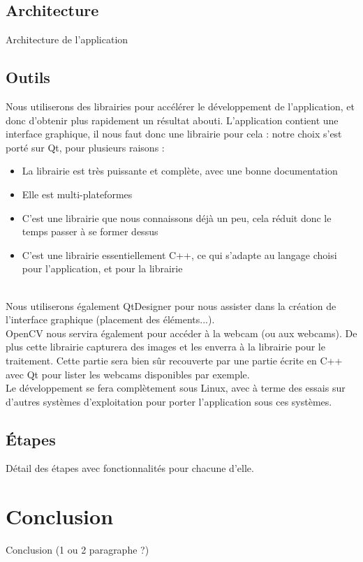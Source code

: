 \documentclass{article}
\begin{document}
		\subsection{Architecture}
			Architecture de l'application
		\subsection{Outils}
			Nous utiliserons des librairies pour accélérer le développement de l'application, et donc d'obtenir plus 
rapidement un résultat abouti.
		L'application contient une interface graphique, il nous faut donc une librairie pour cela :
		notre choix s'est porté sur Qt, pour plusieurs raisons : 
		\begin{itemize}
			\item La librairie est très puissante et complète, avec une bonne documentation
			\item Elle est multi-plateformes
			\item C'est une librairie que nous connaissons déjà un peu, cela réduit donc le temps passer à se former dessus
			\item C'est une librairie essentiellement C++, ce qui s'adapte au langage choisi pour l'application, et pour la librairie
		\end{itemize} \ \\
Nous utiliserons également QtDesigner pour nous assister dans la création de l'interface graphique (placement des éléments...). \\
		
OpenCV nous servira également pour accéder à la webcam (ou aux webcams). De plus cette librairie capturera des images et les enverra à la librairie pour le traitement. Cette partie sera bien sûr recouverte par une partie écrite en C++ avec Qt pour lister les webcams disponibles par exemple. \\

		Le développement se fera complètement sous Linux, avec à terme des essais sur d'autres systèmes d'exploitation pour
porter l'application sous ces systèmes. \\ 

		\subsection{Étapes}
			Détail des étapes avec fonctionnalités pour chacune d'elle.
	\section{Conclusion}
		Conclusion (1 ou 2 paragraphe ?)
	
\end{document}
